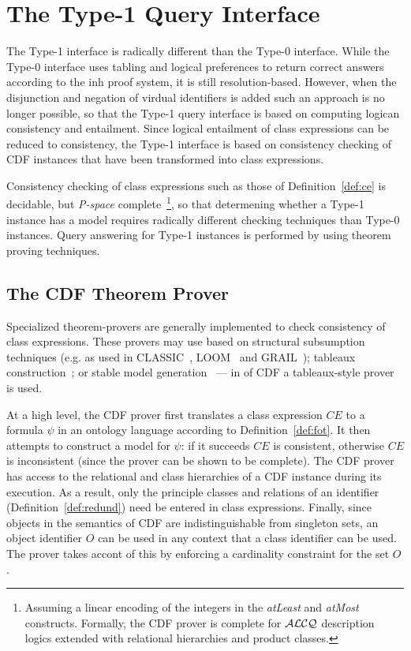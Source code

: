 \section{The Type-1 Query Interface} \label{sec:type1query}

The Type-1 interface is radically different than the Type-0 interface.
While the Type-0 interface uses tabling and logical preferences to
return correct answers according to the {\sc inh} proof system, it is
still resolution-based.  However, when the disjunction and negation of
virdual identifiers is added such an approach is no longer possible,
so that the Type-1 query interface is based on computing logican
consistency and entailment.  Since logical entailment of class
expressions can be reduced to consistency, the Type-1 interface is
based on consistency checking of CDF instances that have been
transformed into class expressions.

Consistency checking of class expressions such as those of
Definition~\ref{def:ce} is decidable, but {\em P-space}
complete~\footnote{Assuming a linear encoding of the integers in the
{\em atLeast} and {\em atMost} constructs.  Formally, the CDF prover
is complete for ${\cal ALCQ}$ description logics extended with
relational hierarchies and product classes.}, so that determening
whether a Type-1 instance has a model requires radically different
checking techniques than Type-0 instances.  Query answering for Type-1
instances is performed by using theorem proving techniques.

\subsection{The CDF Theorem Prover}

Specialized theorem-provers are generally implemented to check
consistency of class expressions.  These provers may use based on
structural subsumption techniques (e.g. as used in
CLASSIC~\cite{PMBRB91}, LOOM~\cite{MacB94} and GRAIL~\cite{RBGHNS97});
tableaux construction~\cite{HoPS99}; or stable model
generation~\cite{Swif04} --- in \version{} of CDF a tableaux-style
prover is used.

At a high level, the CDF prover first translates a class expression
$CE$ to a formula $\psi$ in an ontology language according to
Definition~\ref{def:fot}.  It then attempts to construct a model for
$\psi$: if it succeeds $CE$ is consistent, otherwise $CE$ is
inconsistent (since the prover can be shown to be complete).  The CDF
prover has access to the relational and class hierarchies of a CDF
instance during its execution.  As a result, only the principle
classes and relations of an identifier (Definition~\ref{def:redund})
need be entered in class expressions.  Finally, since objects in the
semantics of CDF are indistinguishable from singleton sets, an object
identifier $O$ can be used in any context that a class identifier can
be used.  The prover takes accont of this by enforcing a cardinality
constraint for the set $O$.

